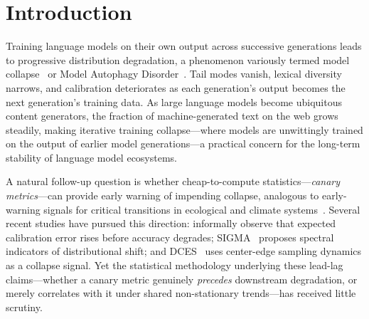 \section{Introduction}
\label{sec:introduction}

Training language models on their own output across successive generations leads to progressive distribution degradation, a phenomenon variously termed model collapse~\cite{shumailov2024curse} or Model Autophagy Disorder~\cite{alemohammad2024mad}.
Tail modes vanish, lexical diversity narrows, and calibration deteriorates as each generation's output becomes the next generation's training data.
As large language models become ubiquitous content generators, the fraction of machine-generated text on the web grows steadily, making iterative training collapse---where models are unwittingly trained on the output of earlier model generations---a practical concern for the long-term stability of language model ecosystems.

A natural follow-up question is whether cheap-to-compute statistics---\emph{canary metrics}---can provide early warning of impending collapse, analogous to early-warning signals for critical transitions in ecological and climate systems~\cite{scheffer2009early,scheffer2012anticipating}.
Several recent studies have pursued this direction: \citet{du2026geometric} informally observe that expected calibration error rises before accuracy degrades; SIGMA~\cite{sigma2026spectral} proposes spectral indicators of distributional shift; and DCES~\cite{dces2026counter} uses center-edge sampling dynamics as a collapse signal.
Yet the statistical methodology underlying these lead-lag claims---whether a canary metric genuinely \emph{precedes} downstream degradation, or merely correlates with it under shared non-stationary trends---has received little scrutiny.

